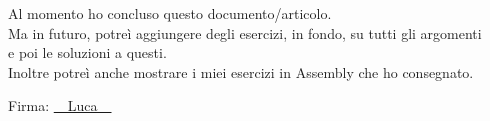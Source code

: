 \textsf{{\normalsize Al momento ho concluso questo documento/articolo. \\ Ma in futuro, potreì aggiungere degli esercizi, in fondo, su tutti gli argomenti \\
		e poi le soluzioni a questi.}} \\
	
\textsf{{\normalsize Inoltre potreì anche mostrare i miei esercizi in Assembly che ho consegnato.}} \break


\flushleft
\large

Firma: {\cursive\setul{0.1ex}{}\ul{~~Luca~~}}

